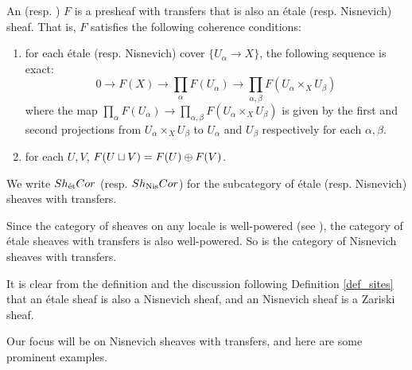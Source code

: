 \begin{defn}\label{def_etale_sheaf}\label{def_nis_sheaf}
An  (resp. ) $F$ is a presheaf with transfers that is also
an \'etale (resp. Nisnevich) sheaf. That is, $F$ satisfies the
following coherence conditions:
\begin{enumerate}
\item for each \'etale (resp. Nisnevich) cover $\{U_\alpha \to 
X\}$, the following sequence is exact:
\[
0 \to F(X) \to \prod_\alpha F(U_\alpha) \to \prod_{\alpha, \beta} 
   F(U_\alpha \times_X U_\beta)
\]
where the map $\prod_\alpha F(U_\alpha) \to \prod_{\alpha, \beta} 
F(U_\alpha \times_X U_\beta)$ is given by the first and second 
projections from $U_\alpha \times_X U_\beta$ to $U_\alpha$ and
$U_\beta$ respectively for each $\alpha, \beta$.

\item for each $U, V$, $F(U \sqcup V) = F(U) \oplus F(V)$.
\end{enumerate}

\noindent We write $Sh_{\mathrm{\acute{e}t}}Cor$ (resp. $Sh_{\mathrm{Nis}}Cor$) for the 
subcategory of \'etale (resp. Nisnevich) sheaves with transfers.
\end{defn}

Since the category of sheaves on any locale is well-powered
(see \cite[2.3.7]{Bo}), the category of \'etale sheaves 
with transfers is also well-powered. So is the category of 
Nisnevich sheaves with transfers.

It is clear from the definition and the discussion 
following Definition \ref{def_sites} that an \'etale sheaf is also 
a Nisnevich sheaf, and an Nisnevich sheaf is a Zariski sheaf.

Our focus will be on Nisnevich sheaves with transfers, and here 
are some prominent examples.

